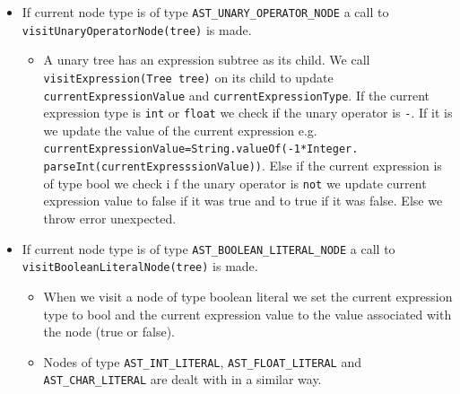 \begin{itemize}
        \item If current node type is of type \verb!AST_UNARY_OPERATOR_NODE! a call to \verb!visitUnaryOperatorNode(tree)! is made.
         \begin{itemize}
        \item A unary tree has an expression subtree as its child. We call \verb!visitExpression(Tree tree)! on  its child to update \verb!currentExpressionValue! and \verb!currentExpressionType!. If the current expression type is \verb!int! or \verb!float!  we check if the unary operator is \verb!-!. If it is we update the value of the current expression e.g. \verb!currentExpressionValue=String.valueOf(-1*Integer.!
        \verb!parseInt(currentExpresssionValue))!. Else if the current expression is of type bool we check i f the unary operator is \verb!not! we update current expression value to false if it was true and to true if it was false.
        Else we throw error unexpected.
        \end{itemize}
        
         \item If current node type is of type \verb!AST_BOOLEAN_LITERAL_NODE! a call to \verb!visitBooleanLiteralNode(tree)! is made.
         \begin{itemize}
             \item When we visit a node of type boolean literal we set the current expression type to bool and the current expression value to the value associated with the node (true or false).
         \item Nodes of type \verb!AST_INT_LITERAL!, \verb!AST_FLOAT_LITERAL! and \verb!AST_CHAR_LITERAL! are dealt with in a similar way.
       
         \end{itemize}
         

\end{itemize}

